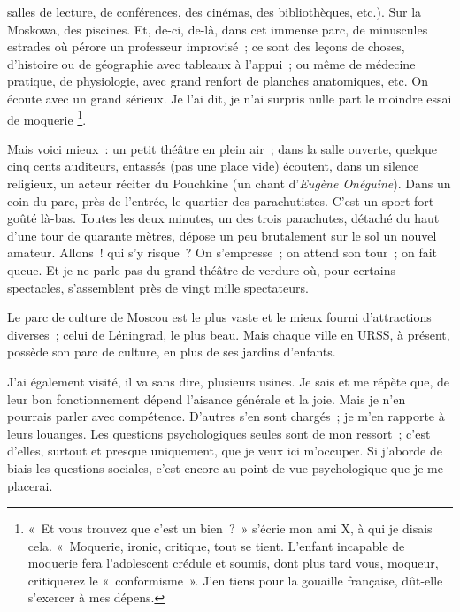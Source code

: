 \documentclass[twoside]{book} %
\newcommand{\astermono}{\medskip\centerline{\color{rubric}\large\selectfont{\syms ✻}}\medskip\par}%
\begin{document}
salles de lecture, de conférences, des cinémas, des bibliothèques, etc.). Sur la Moskowa, des piscines. Et, de-ci, de-là, dans cet immense parc, de minuscules estrades où pérore un professeur improvisé ; ce sont des leçons de choses, d’histoire ou de géographie avec tableaux à l’appui ; ou même de médecine pratique, de physiologie, avec grand renfort de planches anatomiques, etc. On écoute avec un grand sérieux. Je l’ai dit, je n’ai surpris nulle part le moindre essai de moquerie \footnote{« Et vous trouvez que c’est un bien ? » s’écrie mon ami X, à qui je disais cela. « Moquerie, ironie, critique, tout se tient. L’enfant incapable de moquerie fera l’adolescent crédule et soumis, dont plus tard vous, moqueur, critiquerez le « conformisme ». J’en tiens pour la gouaille française, dût-elle s’exercer à mes dépens.}.\par
Mais voici mieux : un petit théâtre en plein air ; dans la salle ouverte, quelque cinq cents auditeurs, entassés (pas une place vide) écoutent, dans un silence religieux, un acteur réciter du Pouchkine (un chant d’\emph{Eugène Onéguine}). Dans un coin du parc, près de l’entrée, le quartier des parachutistes. C’est un sport fort goûté là-bas. Toutes les deux minutes, un des trois parachutes, détaché du haut d’une tour de quarante mètres, dépose un peu brutalement sur le sol un nouvel amateur. Allons ! qui s’y risque ? On s’empresse ; on attend son tour ; on fait queue. Et je ne parle pas du grand théâtre de verdure où, pour certains spectacles, s’assemblent près de vingt mille spectateurs.\par
Le parc de culture de Moscou est le plus vaste et le mieux fourni d’attractions diverses ; celui de Léningrad, le plus beau. Mais chaque ville en URSS, à présent, possède son parc de culture, en plus de ses jardins d’enfants.\par
J’ai également visité, il va sans dire, plusieurs usines. Je sais et me répète que, de leur bon fonctionnement dépend l’aisance générale et la joie. Mais je n’en pourrais parler avec compétence. D’autres s’en sont chargés ; je m’en rapporte à leurs louanges. Les questions psychologiques seules sont de mon ressort ; c’est d’elles, surtout et presque uniquement, que je veux ici m’occuper. Si j’aborde de biais les questions sociales, c’est encore au point de vue psychologique que je me placerai.\par

\astermono
\end{document}
